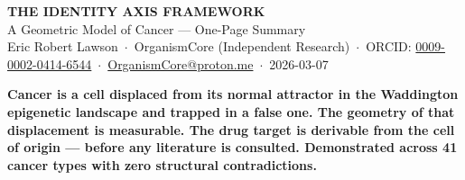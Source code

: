 \documentclass[9.5pt, a4paper]{article}
\begin{document}
\begin{center}
  {\large\bfseries\color{headerblue}
  THE IDENTITY AXIS FRAMEWORK}\\[0.15em]
  {\small\color{headerblue}
  A Geometric Model of Cancer — One-Page Summary}\\[0.1em]
  {\footnotesize
  Eric Robert Lawson\ $\cdot$\
  OrganismCore (Independent Research)\ $\cdot$\
  ORCID:
  \href{https://orcid.org/0009-0002-0414-6544}
  {0009-0002-0414-6544}\ $\cdot$\
  \href{mailto:OrganismCore@proton.me}
  {OrganismCore@proton.me}\ $\cdot$\
  2026-03-07}
\end{center}

\vspace{0.15em}

\begin{mdframed}[
  backgroundcolor=statementbox,
  linecolor=statementbox,
  linewidth=0pt,
  innertopmargin=0.35em,
  innerbottommargin=0.35em,
  innerleftmargin=0.7em,
  innerrightmargin=0.7em
]
\begin{center}
\footnotesize\bfseries\color{white}
Cancer is a cell displaced from its normal attractor in the Waddington
epigenetic landscape and trapped in a false one.
The geometry of that displacement is measurable.
The drug target is derivable from the cell of origin — before any
literature is consulted.
Demonstrated across \textbf{41 cancer types} with
\textbf{zero structural contradictions}.
\end{center}
\end{mdframed}

\vspace{0.3em}
\end{document}

